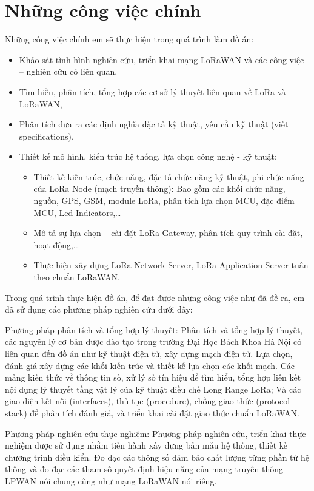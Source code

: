 \section{Những công việc chính}
Những công việc chính em sẽ thực hiện trong quá trình làm đồ án:
\begin{itemize}
\item	Khảo sát tình hình nghiên cứu, triển khai mạng LoRaWAN và các công việc – nghiên cứu có liên quan,
\item	Tìm hiều, phân tích, tổng hợp các cơ sở lý thuyết liên quan về LoRa và LoRaWAN,
\item	Phân tích đưa ra các định nghĩa đặc tả kỹ thuật, yêu cầu kỹ thuật (viết specifications),
\item	Thiết kế mô hình, kiến trúc hệ thống, lựa chọn công nghệ - kỹ thuật: 
	\begin{itemize}
	\item	Thiết kế kiến trúc, chức năng, đặc tả chức năng kỹ thuật, phi chức năng của LoRa Node (mạch truyền thông): Bao gồm các khối chức năng, nguồn, GPS, GSM, module LoRa, phân tích lựa chọn MCU, đặc điểm MCU, Led Indicators,… 
    \item	Mô tả sự lựa chọn – cài đặt LoRa-Gateway, phân tích quy trình cài đặt, hoạt động,…
    \item	Thực hiện xây dựng LoRa Network Server, LoRa Application Server tuân theo chuẩn LoRaWAN. 

	\end{itemize}

\end{itemize}
Trong quá trình thực hiện đồ án, để đạt được những công việc như đã đề ra, em đã sử dụng các phương pháp nghiên cứu dưới đây: \par
Phương pháp phân tích và tổng hợp lý thuyết: Phân tích và tổng hợp lý thuyết, các nguyên lý cơ bản được đào tạo trong trường Đại Học Bách Khoa Hà Nội có liên quan đến đồ án như kỹ thuật điện tử, xây dựng mạch điện tử. Lựa chọn, đánh giá xây dựng các khối kiến trúc và thiết kế lựa chọn các khối mạch. Các mảng kiến thức về thông tin số, xử lý số tín hiệu để tìm hiểu, tổng hợp liên kết nội dụng lý thuyết tầng vật lý của kỹ thuật điều chế Long Range LoRa; Và các giao diện kết nối (interfaces), thủ tục (procedure), chồng giao thức (protocol stack) để phân tích đánh giá, và triển khai cài đặt giao thức chuẩn LoRaWAN. \par 
Phương pháp nghiên cứu thực nghiệm: Phương pháp nghiên cứu, triển khai thực nghiệm được sử dụng nhằm tiến hành xây dựng bản mẫu hệ thống, thiết kế chương trình điều kiển. Đo đạc các thông số đảm bảo chất lượng từng phần tử hệ thống và đo đạc các tham số quyết định hiệu năng của mạng truyền thông LPWAN nói chung cũng như mạng LoRaWAN nói riêng. 
